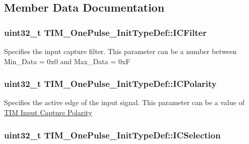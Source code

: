 \subsection{Member Data Documentation}
\hypertarget{struct_t_i_m___one_pulse___init_type_def_a883e69dec14d8bde9914906be1b04ad7}{
\subsubsection[{I\-C\-Filter}]{\setlength{\rightskip}{0pt plus 5cm}uint32\-\_\-t T\-I\-M\-\_\-\-One\-Pulse\-\_\-\-Init\-Type\-Def\-::\-I\-C\-Filter}}\label{struct_t_i_m___one_pulse___init_type_def_a883e69dec14d8bde9914906be1b04ad7}
Specifies the input capture filter. This parameter can be a number between Min\-\_\-\-Data = 0x0 and Max\-\_\-\-Data = 0x\-F \hypertarget{struct_t_i_m___one_pulse___init_type_def_a8589cf95218ea62604b845054b36b772}{
\subsubsection[{I\-C\-Polarity}]{\setlength{\rightskip}{0pt plus 5cm}uint32\-\_\-t T\-I\-M\-\_\-\-One\-Pulse\-\_\-\-Init\-Type\-Def\-::\-I\-C\-Polarity}}\label{struct_t_i_m___one_pulse___init_type_def_a8589cf95218ea62604b845054b36b772}
Specifies the active edge of the input signal. This parameter can be a value of \hyperlink{group___t_i_m___input___capture___polarity}{T\-I\-M Input Capture Polarity} \hypertarget{struct_t_i_m___one_pulse___init_type_def_a9e8853f17e85393a869aa2ecb315f030}{
\subsubsection[{I\-C\-Selection}]{\setlength{\rightskip}{0pt plus 5cm}uint32\-\_\-t T\-I\-M\-\_\-\-One\-Pulse\-\_\-\-Init\-Type\-Def\-::\-I\-C\-Selection}}\label{struct_t_i_m___one_pulse___init_type_def_a9e8853f17e85393a869aa2ecb315f030}
